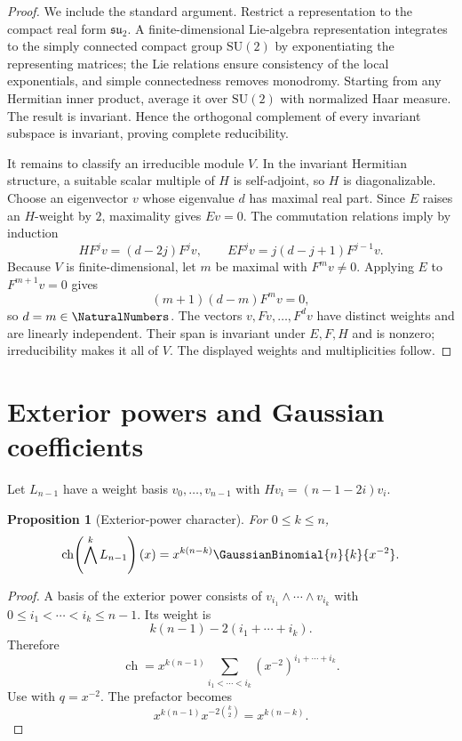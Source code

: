 \documentclass[11pt,a4paper,oneside,openany]{book}
\newtheorem{proposition}[proposition]{Proposition}
\theoremstyle{definition}
\theoremstyle{remark}
\newcommand{\ch}{\operatorname{ch}}
\begin{document}
\begin{proof}
We include the standard argument.  Restrict a representation to the compact real form $\mathfrak{su}_2$.  A finite-dimensional Lie-algebra representation integrates to the simply connected compact group $\mathrm{SU}(2)$ by exponentiating the representing matrices; the Lie relations ensure consistency of the local exponentials, and simple connectedness removes monodromy.  Starting from any Hermitian inner product, average it over $\mathrm{SU}(2)$ with normalized Haar measure.  The result is invariant.  Hence the orthogonal complement of every invariant subspace is invariant, proving complete reducibility.

It remains to classify an irreducible module $V$.  In the invariant Hermitian structure, a suitable scalar multiple of $H$ is self-adjoint, so $H$ is diagonalizable.  Choose an eigenvector $v$ whose eigenvalue $d$ has maximal real part.  Since $E$ raises an $H$-weight by $2$, maximality gives $Ev=0$.  The commutation relations imply by induction
\[
 H F^jv=(d-2j)F^jv,
 \qquad
 E F^jv=j(d-j+1)F^{j-1}v.
\]
Because $V$ is finite-dimensional, let $m$ be maximal with $F^mv\ne0$.  Applying $E$ to $F^{m+1}v=0$ gives
\[
 (m+1)(d-m)F^mv=0,
\]
so $d=m\in\NaturalNumbers$.  The vectors $v,Fv,\dots,F^dv$ have distinct weights and are linearly independent.  Their span is invariant under $E,F,H$ and is nonzero; irreducibility makes it all of $V$.  The displayed weights and multiplicities follow.
\end{proof}

\section{Exterior powers and Gaussian coefficients}

Let $L_{n-1}$ have a weight basis $v_0,\dots,v_{n-1}$ with
\(
 Hv_i=(n-1-2i)v_i.
\)

\begin{proposition}[Exterior-power character]\label{prop:exterior-character}
For $0\le k\le n$,
\[
 \ch\!\left(\bigwedge^kL_{n-1}\right)(x)
 =x^{k(n-k)}\GaussianBinomial{n}{k}{x^{-2}}.
\]
\end{proposition}

\begin{proof}
A basis of the exterior power consists of
\(
 v_{i_1}\wedge\cdots\wedge v_{i_k}
\)
with $0\le i_1<\cdots<i_k\le n-1$.  Its weight is
\[
 k(n-1)-2(i_1+\cdots+i_k).
\]
Therefore
\[
 \ch=x^{k(n-1)}
 \sum_{i_1<\cdots<i_k}(x^{-2})^{i_1+\cdots+i_k}.
\]
Use  with $q=x^{-2}$.  The prefactor becomes
\[
 x^{k(n-1)}x^{-2\binom k2}=x^{k(n-k)}.
\]
\end{proof}
\end{document}
